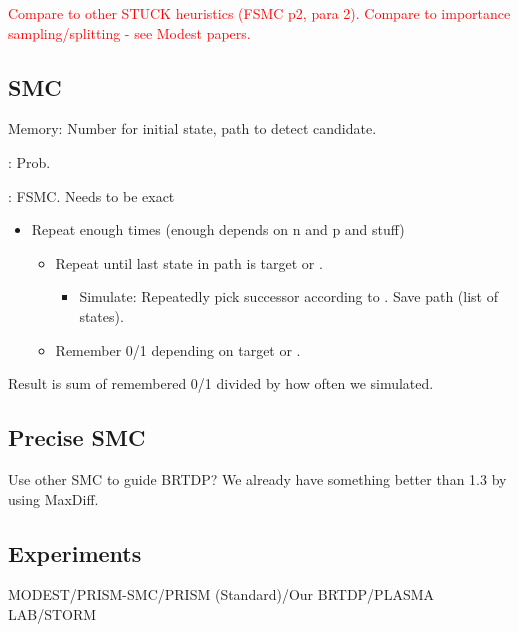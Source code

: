 \textcolor{red}{Compare to other STUCK heuristics (FSMC p2, para 2). Compare to importance sampling/splitting - see Modest papers.}

\subsection{SMC}

Memory: Number for initial state, path to detect candidate.

\nextstate: Prob.

\stuck: FSMC.
Needs to be exact

\begin{itemize}
	\item Repeat enough times (enough depends on n and p and stuff)
	\begin{itemize}
		\item Repeat until last state in path is target or \stuck.
		\begin{itemize}
			\item Simulate: Repeatedly pick successor according to \nextstate. Save path (list of states).
		\end{itemize}
		\item Remember 0/1 depending on target or \stuck.
	\end{itemize}
\end{itemize}

Result is sum of remembered 0/1 divided by how often we simulated.


\subsection{Precise SMC}

Use other SMC to guide BRTDP? We already have something better than 1.3 by using MaxDiff.

\subsection{Experiments}

MODEST/PRISM-SMC/PRISM (Standard)/Our BRTDP/PLASMA LAB/STORM